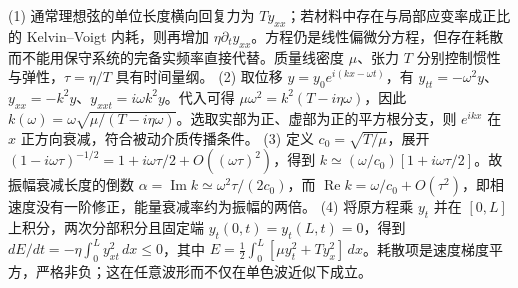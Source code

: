 (1) 通常理想弦的单位长度横向回复力为 \(Ty_{xx}\)；若材料中存在与局部应变率成正比的 Kelvin–Voigt 内耗，则再增加 \(\eta\partial_t y_{xx}\)。方程仍是线性偏微分方程，但存在耗散而不能用保守系统的完备实频率直接代替。质量线密度 \(\mu\)、张力 \(T\) 分别控制惯性与弹性，\(\tau=\eta/T\) 具有时间量纲。
(2) 取位移 \(y=y_0e^{i(kx-\omega t)}\)，有 \(y_{tt}=-\omega^2y\)、\(y_{xx}=-k^2y\)、\(y_{xxt}=i\omega k^2y\)。代入可得 \(\mu\omega^2=k^2(T-i\eta\omega)\)，因此 \(k(\omega)=\omega\sqrt{\mu/(T-i\eta\omega)}\)。选取实部为正、虚部为正的平方根分支，则 \(e^{ikx}\) 在 \(x\) 正方向衰减，符合被动介质传播条件。
(3) 定义 \(c_0=\sqrt{T/\mu}\)，展开 \((1-i\omega\tau)^{-1/2}=1+i\omega\tau/2+O((\omega\tau)^2)\)，得到 \(k\simeq(\omega/c_0)[1+i\omega\tau/2]\)。故振幅衰减长度的倒数 \(\alpha=\operatorname{Im}k\simeq\omega^2\tau/(2c_0)\)，而 \(\operatorname{Re}k=\omega/c_0+O(\tau^2)\)，即相速度没有一阶修正，能量衰减率约为振幅的两倍。
(4) 将原方程乘 \(y_t\) 并在 \([0,L]\) 上积分，两次分部积分且固定端 \(y_t(0,t)=y_t(L,t)=0\)，得到 \(dE/dt=-\eta\int_0^L y_{xt}^2\,dx\le0\)，其中 \(E=\frac12\int_0^L[\mu y_t^2+Ty_x^2]\,dx\)。耗散项是速度梯度平方，严格非负；这在任意波形而不仅在单色波近似下成立。
